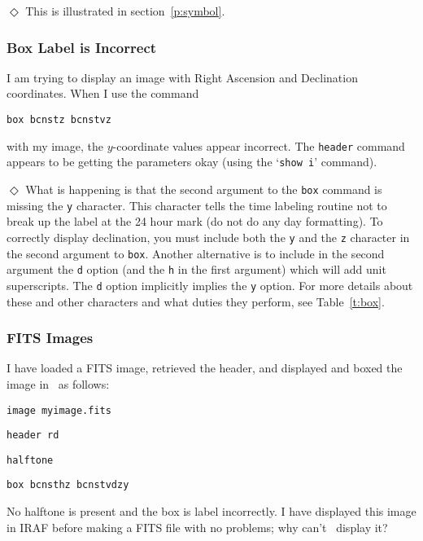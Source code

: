 \indent$\Diamond$
This is illustrated in section~\ref{p:symbol}.

\subsubsection*         {Box Label is Incorrect}

I am trying to display an image with Right Ascension and
Declination coordinates.  When I use the command
\begin{wiplist}%
  \item {\tt box bcnstz bcnstvz}
\end{wiplist}
with my image,
the $y$-coordinate values appear incorrect.
The {\tt header} command appears to be 
getting the parameters okay
(using the `{\tt show i}' command).

\indent$\Diamond$
What is happening is that the second argument to the {\tt box} command
is missing the {\tt y} character.
This character tells the time labeling routine not to break up the label
at the 24 hour mark (\ie do not do any day formatting).
To correctly display declination, you must include both the {\tt y} and
the {\tt z} character in the second argument to {\tt box}.
Another alternative is to include in the second argument the {\tt d} option
(and the {\tt h} in the first argument)
which will add unit superscripts.
The {\tt d} option implicitly implies the {\tt y} option.
For more details about these and other characters and what duties they perform,
see Table~\ref{t:box}.

\subsubsection*         {FITS Images}

I have loaded a FITS image,
retrieved the header, and displayed and boxed the image in \wip\ as follows:
\begin{wiplist}%
  \item {\tt image myimage.fits}
\samepage
  \item {\tt header rd}
  \item {\tt halftone}
  \item {\tt box bcnsthz bcnstvdzy}
\end{wiplist}
No halftone is present and the box is label incorrectly.
I have displayed this image in IRAF before making a FITS file
with no problems; why can't \wip\ display it?

